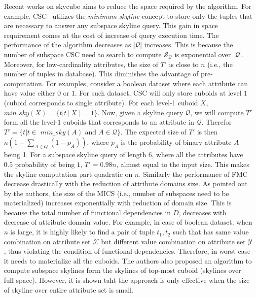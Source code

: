 Recent works on skycube aims to reduce the space required by the algorithm. For example, CSC~\cite{xia2012online} utilizes the \textit{minimum skyline} concept to store only the tuples that are necessary to answer any subspace skyline query. This gain in space requirement comes at the cost of increase of query execution time. The performance of the algorithm decreases as $|\mathcal{Q}|$ increases. This is because the number of subspace CSC need to search to compute $\mathcal{S}_{\mathcal{Q}}$ is exponential over $|\mathcal{Q}|$. Moreover, for low-cardinality attributes, the size of $T'$ is close to $n$ (i.e., the number of tuples in database). This diminishes the advantage of pre-computation. For examples, consider a boolean dataset where each attribute can have value either $0$ or $1$. For such dataset, CSC will only store cuboids at level $1$ (cuboid corresponds to single attribute). For each level-1  cuboid $X$, $min\_sky(X) = \{t | t[X] = 1 \}$. Now, given a skyline query $\mathcal{Q}$, we will compute $T'$ form all the level-1 cuboids that corresponds to an attribute in $\mathcal{Q}$. Therefor $T' = \{t | t \in \textit{ min\_sky} (A) \text{ and } A \in \mathcal{Q} \}$. The expected size of $T'$ is then $n (1 - \sum_{A \in Q}(1-p_A))$, where $p_A$ is the probability of binary attribute $A$ being 1. For a subspace skyline query of length $6$, where all the attributes have $0.5$ probability of being $1$, $T' = 0.98n$, almost equal to the input size. This makes the skyline computation part quadratic on $n$. Similarly the performance of FMC decrease drastically with the reduction of attribute domains size. As pointed out by the authors, the size of the MICS (i.e., number of subspaces need to be materialized) increases exponentially with reduction of domain size. This is because the total number of functional dependencies in $D$, decreases with decrease of attribute domain value. For example, in case of boolean dataset, when $n$ is large, it is highly likely to find a pair of tuple $t_1, t_2$ such that has same value combination on attribute set $\mathcal{X}$ but different value combination on attribute set $\mathcal{Y}$, thus violating the condition of functional dependencies. Therefore, in worst case it needs to materialize all the cuboids. The authors also proposed an algorithm to compute subspace skylines form the skylines of top-most cuboid (skylines over full-space). However, it is shown taht the approach is only effective when the size of skyline over entire attribute set is small.

